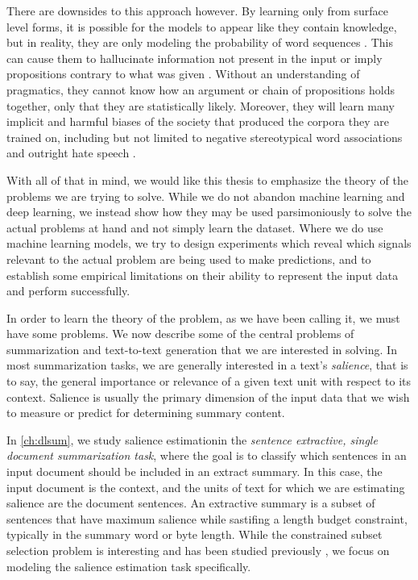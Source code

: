 There are downsides to this approach however. By learning only from surface
level forms, it is possible for the models to appear like they contain
knowledge, but in reality, they are only modeling the probability of word
sequences \citep{bender2020}. This can cause them to hallucinate information
not present in the input or imply propositions contrary to what was given
\citep{wiseman2017,kryscinski2019,maynez2020,kryscinski2020}.  Without an
understanding of pragmatics, they cannot know how an argument or chain of
propositions holds together, only that they are statistically likely.
Moreover, they will learn many implicit and harmful biases of the society that
produced the corpora they are trained on, including but not limited to
negative stereotypical word associations \citep{bolukbasi2016,nissim2020} and
outright hate speech \citep{lee2016}.

With all of that in mind, we would like this thesis to emphasize the theory of
the problems we are trying to solve. While we do not abandon machine learning
and deep learning, we instead show how they may be used parsimoniously to
solve the actual problems at hand and not simply learn the dataset. Where we
do use machine learning models, we try to design experiments which reveal
which signals relevant to the actual problem are being used to make
predictions, and to establish some empirical limitations on their ability to
represent the input data and perform successfully. 
 
In order to learn the theory of the problem, as we have been calling it, we
must have some problems. We now describe some of the central problems of
summarization and text-to-text generation that we are interested in solving.
In most summarization tasks, we are generally interested in a text's
\textit{salience}, that is to say, the general importance or relevance of a
given text unit with respect to its context. Salience is usually the primary
dimension of the input data that we wish to measure or predict for determining
summary content.  

In \autoref{ch:dlsum}, we study salience estimationin the \emph{sentence
extractive, single document summarization task}, where the goal is to classify
which sentences in an input document should be included in an extract summary.
In this case, the input document is the context, and the units of text for
which we are estimating salience are the document sentences.  An extractive
summary is a subset of sentences that have maximum salience while sastifing a
length budget constraint, typically in the summary word or byte length. While
the constrained subset selection problem is interesting and has been studied
previously \citep{goldstein1998,mcdonald2007,lin2010}, we focus on modeling
the salience estimation task specifically. 
 
